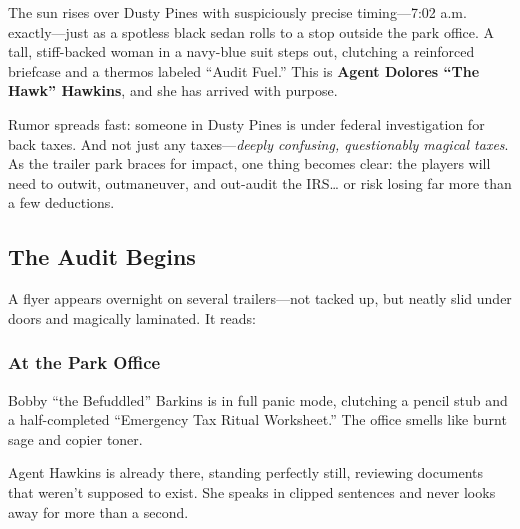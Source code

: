 The sun rises over Dusty Pines with suspiciously precise timing—7:02 a.m. exactly—just as a spotless black sedan rolls to a stop outside the park office. A tall, stiff-backed woman in a navy-blue suit steps out, clutching a reinforced briefcase and a thermos labeled “Audit Fuel.” This is \textbf{Agent Dolores “The Hawk” Hawkins}, and she has arrived with purpose.

Rumor spreads fast: someone in Dusty Pines is under federal investigation for back taxes. And not just any taxes—\textit{deeply confusing, questionably magical taxes}. As the trailer park braces for impact, one thing becomes clear: the players will need to outwit, outmaneuver, and out-audit the IRS… or risk losing far more than a few deductions.

\subsection{The Audit Begins}

A flyer appears overnight on several trailers—not tacked up, but neatly slid under doors and magically laminated. It reads:

\begin{center}
\end{center}

\subsubsection*{At the Park Office}
Bobby “the Befuddled” Barkins is in full panic mode, clutching a pencil stub and a half-completed “Emergency Tax Ritual Worksheet.” The office smells like burnt sage and copier toner.

Agent Hawkins is already there, standing perfectly still, reviewing documents that weren’t supposed to exist. She speaks in clipped sentences and never looks away for more than a second.

